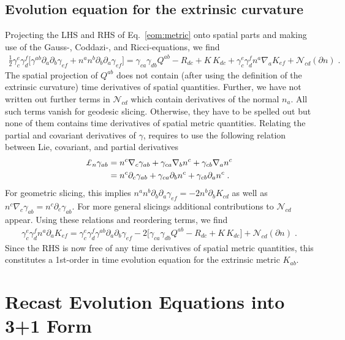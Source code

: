 \documentclass[a4paper,oneside,openany,11pt]{memoir}
\numberwithin{equation}{section} %
\begin{document}
{\subsection{Evolution equation for the extrinsic curvature}
Projecting the LHS and RHS of Eq.~\eqref{eom:metric} onto spatial parts and making use of the Gauss-, Coddazi-, and Ricci-equations, we find
\begin{align}
	\frac{1}{2}\gamma_c^e\gamma_d^f\Big[ 
		\gamma^{ab}\partial_a\partial_b\gamma_{ef}
		+ n^an^b\partial_b\partial_a\gamma_{ef}
	\Big] = \gamma_{ca}\gamma_{db}Q^{ab} - R_{dc} + K\,K_{dc} + \gamma_c^e\gamma_d^f n^a\nabla_a K_{ef}
	+ \mathcal{N}_{cd}(\partial n)\;.
\end{align}
The spatial projection of $Q^{ab}$ does not contain (after using the definition of the extrinsic curvature) time derivatives of spatial quantities. Further, we have not written out further terms in $\mathcal{N}_{cd}$ which contain derivatives of the normal $n_a$. All such terms vanish for geodesic slicing. Otherwise, they have to be spelled out but none of them contains time derivatives of spatial metric quantities. Relating the partial and covariant derivatives of $\gamma$, requires to use the following relation between Lie, covariant, and partial derivatives
\begin{align}
	\pounds_n\gamma_{ab} &= n^c\nabla_c\gamma_{ab} + \gamma_{ca}\nabla_b n^c + \gamma_{cb}\nabla_a n^c
	\notag\\
	&=n^c\partial_c\gamma_{ab} + \gamma_{ca}\partial_b n^c + \gamma_{cb}\partial_a n^c\;.
\end{align}
For geometric slicing, this implies $n^an^b\partial_b\partial_a\gamma_{ef} = -2n^b\partial_bK_{cd}$ as well as $n^c\nabla_c\gamma_{ab} = n^c\partial_c\gamma_{ab}$. For more general slicings additional contributions to $\mathcal{N}_{cd}$ appear. Using these relations and reordering terms, we find
\begin{align}
	\gamma_c^e\gamma_d^f n^a \partial_a K_{ef} = 
	\gamma_c^e\gamma_d^f \gamma^{ab}\partial_a\partial_b\gamma_{ef} 
	- 2\Big[
		\gamma_{ca}\gamma_{db}Q^{ab} - R_{dc} + K\,K_{dc}
	\Big]
	+ \mathcal{N}_{cd}(\partial n)\;.
\end{align}
Since the RHS is now free of any time derivatives of spatial metric quantities, this constitutes a 1st-order in time evolution equation for the extrinsic metric $K_{ab}$.
}


\section{Recast Evolution Equations into 3+1 Form}
\end{document}
